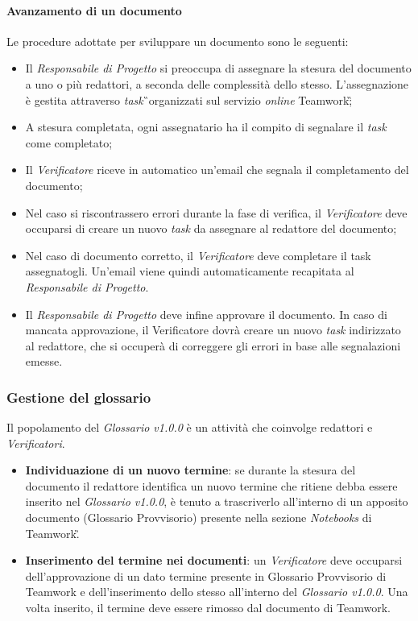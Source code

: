 \paragraph{Avanzamento di un documento}
Le procedure adottate per sviluppare un documento sono le seguenti:
\begin{itemize}
	\item Il \textit{Responsabile di Progetto} si preoccupa di assegnare la stesura del documento a uno o più redattori, a seconda delle complessità dello stesso. L'assegnazione è gestita attraverso \textit{task}\G\ organizzati sul servizio \textit{online} Teamwork\G; 
	\item A stesura completata, ogni assegnatario ha il compito di segnalare il \textit{task} come completato;
	\item Il \textit{Verificatore} riceve in automatico un'email che segnala il completamento del documento;
	\item Nel caso si riscontrassero errori durante la fase di verifica, il \textit{Verificatore} deve occuparsi di creare un nuovo \textit{task} da assegnare al redattore del documento;
	\item Nel caso di documento corretto, il \textit{Verificatore} deve completare il task assegnatogli. Un'email viene quindi automaticamente recapitata al \textit{Responsabile di Progetto}.
	\item Il \textit{Responsabile di Progetto} deve infine approvare il documento. In caso di mancata approvazione, il Verificatore dovrà creare un nuovo \textit{task} indirizzato al redattore, che si occuperà di correggere gli errori in base alle segnalazioni emesse. 
\end{itemize}

\subsubsection{Gestione del glossario}
Il popolamento del \textit{Glossario v1.0.0} è un attività che coinvolge redattori e \textit{Verificatori}.
\begin{itemize}
	\item{\textbf{Individuazione di un nuovo termine}}: se durante la stesura del documento il redattore identifica un nuovo termine che ritiene debba essere inserito nel \textit{Glossario v1.0.0}, è tenuto a trascriverlo all'interno di un apposito documento (Glossario Provvisorio) presente nella sezione \textit{Notebooks} di Teamwork\G.
	\item{\textbf{Inserimento del termine nei documenti}}: un \textit{Verificatore} deve occuparsi dell'approvazione di un dato termine presente in Glossario Provvisorio di Teamwork e dell'inserimento dello stesso all'interno del \textit{Glossario v1.0.0}. Una volta inserito, il termine deve essere rimosso dal documento di Teamwork.
\end{itemize}

